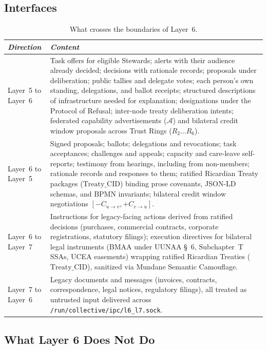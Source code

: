 \subsection{Interfaces}

\begin{table}[htbp]
\centering
\small
\begin{tabular}{|p{}|p{}|}
\hline
\textit{Direction} & \textit{Content} \\
\hline
Layer~5 to Layer~6 & Task offers for eligible Stewards; alerts with their audience already decided; decisions with rationale records; proposals under deliberation; public tallies and delegate votes; each person's own standing, delegations, and ballot receipts; structured descriptions of infrastructure needed for explanation; designations under the Protocol of Refusal; inter-node treaty deliberation intents; federated capability advertisements ($\mathcal{A}$) and bilateral credit window proposals across Trust Rings ($R_2 \dots R_6$). \\
\hline
Layer~6 to Layer~5 & Signed proposals; ballots; delegations and revocations; task acceptances; challenges and appeals; capacity and care-leave self-reports; testimony from hearings, including from non-members; rationale records and responses to them; ratified Ricardian Treaty packages ($\mathrm{Treaty\_CID}$) binding prose covenants, JSON-LD schemas, and BPMN invariants; bilateral credit window negotiations $[-C_{u \to v}, +C_{v \to u}]$. \\
\hline
Layer~6 to Layer~7 & Instructions for legacy-facing actions derived from ratified decisions (purchases, commercial contracts, corporate registrations, statutory filings); execution directives for bilateral legal instruments (BMAA under UUNAA \S~6, Subchapter~T SSAs, UCEA easements) wrapping ratified Ricardian Treaties ($\mathrm{Treaty\_CID}$), sanitized via Mundane Semantic Camouflage. \\
\hline
Layer~7 to Layer~6 & Legacy documents and messages (invoices, contracts, correspondence, legal notices, regulatory filings), all treated as untrusted input delivered across \texttt{/run/collective/ipc/l6\_l7.sock}. \\
\hline
\end{tabular}
\caption{What crosses the boundaries of Layer~6.}
\label{tab:l6-interfaces}
\end{table}

\subsection{What Layer 6 Does Not Do}


